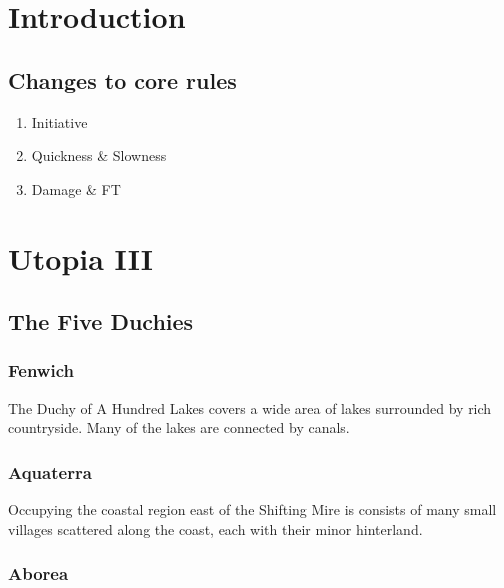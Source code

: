 \documentclass{report}
\begin{document}
\chapter{Introduction}

\section{Changes to core rules}

\begin{enumerate}
\item Initiative
\item Quickness \& Slowness
\item Damage \& FT
\end{enumerate}

\chapter{Utopia III}

\section{The Five Duchies}

\subsection{Fenwich}

The Duchy of A Hundred Lakes covers a wide area of lakes surrounded by
rich countryside.  Many of the lakes are connected by canals.

\subsection{Aquaterra}

Occupying the coastal region east of the Shifting Mire is consists of
many small villages scattered along the coast, each with their minor
hinterland.

\subsection{Aborea}
\end{document}
